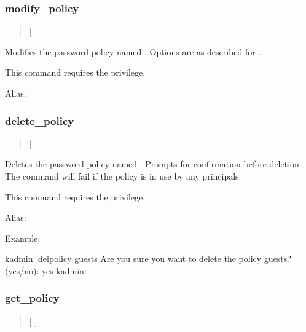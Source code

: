 \documentclass[letterpaper,10pt,english]{sphinxmanual}
\begin{document}
\subsubsection{modify\_policy}
\label{\detokenize{admin/admin_commands/kadmin_local:modify-policy}}\label{\detokenize{admin/admin_commands/kadmin_local:id13}}\begin{quote}

\sphinxAtStartPar
{} {[}\sphinxstyleemphasis{options}{]} 
\end{quote}

\sphinxAtStartPar
Modifies the password policy named .  Options are as described
for .

\sphinxAtStartPar
This command requires the  privilege.

\sphinxAtStartPar
Alias: 


\subsubsection{delete\_policy}
\label{\detokenize{admin/admin_commands/kadmin_local:delete-policy}}\label{\detokenize{admin/admin_commands/kadmin_local:id14}}\begin{quote}

\sphinxAtStartPar
{} {[}\sphinxstylestrong{\sphinxhyphen{}force}{]} 
\end{quote}

\sphinxAtStartPar
Deletes the password policy named .  Prompts for confirmation
before deletion.  The command will fail if the policy is in use by any
principals.

\sphinxAtStartPar
This command requires the  privilege.

\sphinxAtStartPar
Alias: 

\sphinxAtStartPar
Example:

\begin{sphinxVerbatim}[commandchars=\\\{\}]
kadmin: del\PYGZus{}policy guests
Are you sure you want to delete the policy \PYGZdq{}guests\PYGZdq{}?
(yes/no): yes
kadmin:
\end{sphinxVerbatim}


\subsubsection{get\_policy}
\label{\detokenize{admin/admin_commands/kadmin_local:get-policy}}\label{\detokenize{admin/admin_commands/kadmin_local:id15}}\begin{quote}

\sphinxAtStartPar
{} {[}  {]} 
\end{quote}
\end{document}
